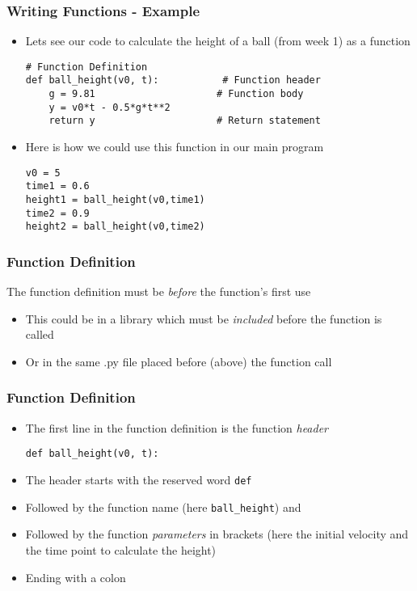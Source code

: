 \documentclass[english,14pt]{beamer}
\begin{document}
\begin{frame}[fragile]
\frametitle{Writing Functions - Example}
\begin{itemize}
\item Lets see our code to calculate the height of a ball (from week 1) as a function
\begin{lstlisting}[style=CStyle]
# Function Definition
def ball_height(v0, t):           # Function header
    g = 9.81                     # Function body
    y = v0*t - 0.5*g*t**2
    return y                     # Return statement
\end{lstlisting}
\pause
\item Here is how we could use this function in our main program
\begin{lstlisting}[style=CStyle]
v0 = 5
time1 = 0.6
height1 = ball_height(v0,time1)
time2 = 0.9
height2 = ball_height(v0,time2)
\end{lstlisting}
\end{itemize}
\end{frame}


\begin{frame}[fragile]
\frametitle{Function Definition}
 The function definition must be \textit{before} the function's first use
 \begin{itemize}
        \item This could be in a library which must be \textit{included} before the function is called
		\item Or in the same .py file placed before (above) the function call 
	\end{itemize}
\end{frame}

\begin{frame}[fragile]
\frametitle{Function Definition}
 \begin{itemize}
		\item The first line in the function definition is the function \textit{header}
			\begin{lstlisting}[style=CStyle]
			      def ball_height(v0, t): 
			\end{lstlisting}
		\item The header starts with the reserved word \texttt{def} 
		\item Followed by the function name (here \texttt{ball\_height}) and 
		\item Followed by the function \textit{parameters} in brackets (here the initial velocity and the time point to calculate the height) 
		\item Ending with a colon
	\end{itemize}
\end{frame}
\end{document}
